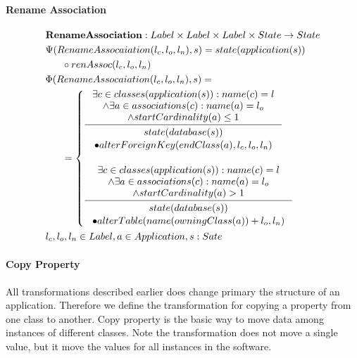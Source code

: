 \documentclass[11pt]{article}
\begin{document}
\paragraph{Rename Association}
\begin{align*}
& \mathbf{RenameAssociation} : Label \times Label \times Label \times State \rightarrow State \\
& \Psi(RenameAssocaiation(l_c, l_o, l_n), s) = state(application(s)) \\ &\;\;\;\;\;\;  \circ renAssoc(l_c, l_o, l_n)\\
& \Phi(RenameAssocaiation(l_c, l_o, l_n), s) = \\
& \;\;\;\;\;\; =\begin{cases}
  \inference{\exists c \in classes(application(s)) : name(c) = l\\ 
		\wedge \exists a \in associations(c) : name(a) = l_o 
	\\ \wedge startCardinality(a) \leq 1 }{\begin{gathered}
state(database(s)) \\ \bullet alterForeignKey(endClass(a) ,l_c, l_o, l_n)
\end{gathered}}\\ \\
	\inference{\exists c \in classes(application(s)) : name(c) = l\\ 
		\wedge \exists a \in associations(c) : name(a) = l_o 
	\\ \wedge startCardinality(a) > 1 }{\begin{gathered}
		state(database(s)) \\ \bullet alterTable(name(owningClass(a)) + l_o, l_n)
\end{gathered}}\\ 
 \end{cases} \\
&	l_c, l_o, l_n \in Label, a \in Application, s : Sate
\end{align*}


\paragraph{Copy Property}
All transformations described earlier does change primary the structure of an application. Therefore we define  the transformation for copying a property from one class to another. Copy property is the basic way to move data among instances of different classes. Note the transformation does not move a single value, but it move the values for all instances in the software.
\end{document}
